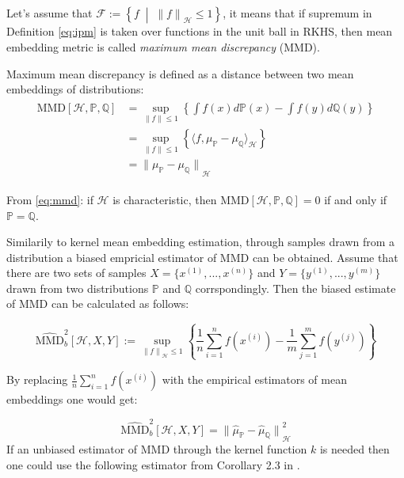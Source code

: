 Let's assume that $\mathcal{F} := \left\{f \;\middle| \;{\lVert f \rVert}_{\mathscr{H}} \leq 1\right\}$, it means that if supremum in Definition \ref{eq:ipm} is taken over functions in the unit ball in RKHS, then mean embedding metric is called \textit{maximum mean discrepancy} (MMD). 

\begin{definition}[IPM]
    Maximum mean discrepancy is defined as a distance between two mean embeddings of distributions:
    \begin{align}
        \begin{split}
            \textrm{MMD} [\mathscr{H}, \mathds{P}, \mathds{Q}] & = \sup_{ \lVert f \rVert \leq 1} \left\{ \int f(x) d\mathds{P}(x) -  \int f(y) d\mathds{Q}(y) \right\} \\ 
            & = \sup_{ \lVert f \rVert \leq 1} \left\{ \langle f, \mu_{\mathds{P}} - \mu_{\mathds{Q}} \rangle_{\mathscr{H}} \right\} \\
            & = {\lVert \mu_{\mathds{P}} - \mu_{\mathds{Q}} \rVert }_{\mathscr{H}}\label{eq:mmd}
        \end{split}
    \end{align}
\end{definition}

From \ref{eq:mmd}: if $\mathscr{H}$ is characteristic, then $\textrm{MMD}[\mathscr{H}, \mathds{P}, \mathds{Q}] = 0$ if and only if $\mathds{P} = \mathds{Q}$.

Similarily to kernel mean embedding estimation,  through samples drawn from a distribution a biased empricial estimator of MMD can be obtained. Assume that there are two sets of samples $X=\{x^{(1)}, ..., x^{(n)}\}$ and $Y=\{y^{(1)}, ..., y^{(m)}\}$ drawn from two distributions $\mathds{P}$ and $\mathds{Q}$ corrspondingly. Then the biased estimate of MMD can be calculated as follows:

\begin{equation}
    \widehat{\textrm{MMD}}_b^2 [\mathscr{H}, X, Y] := \sup_{ {\lVert f \rVert}_{\mathscr{H}} \leq 1} \left\{ \frac{1}{n} \sum^n_{i=1}{f(x^{(i)})} - \frac{1}{m} \sum^m_{j=1}{f(y^{(j)})} \right\} 
\end{equation}

By replacing $\frac{1}{n}\sum^n_{i=1}{f(x^{(i)})}$ with the empirical estimators of mean embeddings one would get:

\begin{equation}
    \widehat{\textrm{MMD}}_b^2 [\mathscr{H}, X, Y] = {\lVert \widehat{\mu}_{\mathds{P}} - \widehat{\mu}_{\mathds{Q}} \rVert }_{\mathscr{H}}^2
\end{equation}
If an unbiased estimator of MMD through the kernel function $k$ is needed then one could use the following estimator from Corollary 2.3 in \cite{Borgwardt}.

